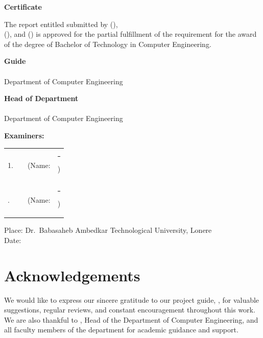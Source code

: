 \thispagestyle{plain}
\vspace*{0.5cm}
\begin{center}
  {\Large\bfseries Certificate}
\end{center}
\vspace{0.6cm}
\noindent
The report entitled {\bfseries \CertificateTitle} submitted by {\bfseries \StudentName} (\RollNo),\\ {\bfseries \StudentTwoName} (\StudentTwoRoll), and {\bfseries \StudentThreeName} (\StudentThreeRoll) is approved for the partial fulfillment of the requirement for the award of the degree of Bachelor of Technology in Computer Engineering.

\vspace*{1.5cm}
\noindent
\begin{minipage}[t]{0.45\textwidth}
  \centering
  \textbf{Guide}\\
  \textbf{\GuideInitials}\\
  Department of Computer Engineering
\end{minipage}
\hfill
\begin{minipage}[t]{0.45\textwidth}
  \centering
  \textbf{Head of Department}\\
  \textbf{\HODName}\\
  Department of Computer Engineering
\end{minipage}

\vspace*{2.2cm}
\noindent
{\bfseries Examiners:} \\[0.5cm]
\noindent
\begin{tabular}{@{}l p{5.5cm} l p{5.5cm}}
  1. & \rule{5cm}{0.4pt} & (Name: & \rule{5cm}{0.4pt}) \\
  \addlinespace[1.5em]
  2. & \rule{5cm}{0.4pt} & (Name: & \rule{5cm}{0.4pt}) \\
\end{tabular}

\vspace*{1.5cm}
\noindent
Place: Dr.\ Babasaheb Ambedkar Technological University, Lonere \\
Date:

\newpage
\chapter*{Acknowledgements}
\thispagestyle{plain}
\noindent
We would like to express our sincere gratitude to our project guide, {\bfseries \GuideName}, for valuable suggestions, regular reviews, and constant encouragement throughout this work. We are also thankful to {\bfseries \HODName}, Head of the Department of Computer Engineering, and all faculty members of the department for academic guidance and support.

